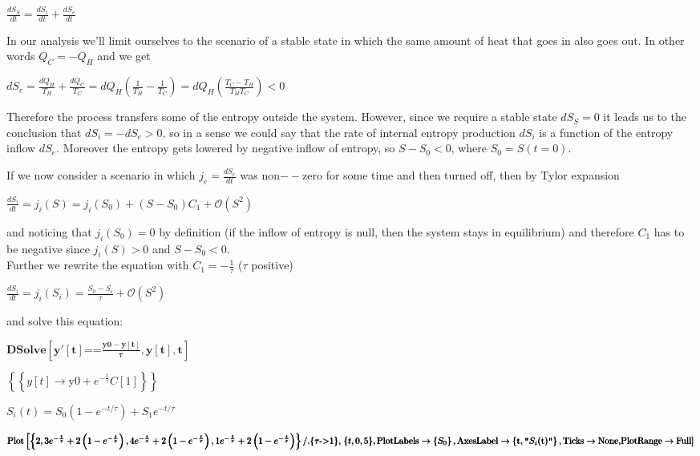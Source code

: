 \documentclass{article}
\begin{document}
\(\frac{dS_S}{dt}=\frac{dS_i}{dt}+\frac{dS_e}{dt}\)

In our analysis we{'}ll limit ourselves to the scenario of a stable state in which the same amount of heat that goes in also goes out. In other words
\(Q_C=-Q_H\) and we get

\(dS_e=\frac{dQ_H}{T_H}+\frac{dQ_C}{T_C}=dQ_H\left(\frac{1}{T_H}-\frac{1}{T_C}\right)=dQ_H\left(\frac{T_C-T_H}{T_HT_C}\right)<0\)

Therefore the process transfers some of the entropy outside the system. However, since we require a stable state \(dS_S=0\) it leads us to the conclusion
that \(dS_i=-dS_e>0\), so in a sense we could say that the rate of internal entropy production \(dS_i\) is a function of the entropy inflow \(dS_e\).
Moreover the entropy gets lowered by negative inflow of entropy, so \(S-S_0<0\), where \(S_0=S(t=0)\).

If we now consider a scenario in which \(j_e=\frac{dS_e}{dt}\) was non$--$zero for some time and then turned off, then by Tylor expansion

\(\frac{dS_i}{dt}=j_i(S)=j_i\left(S_0\right)+\left(S-S_0\right)C_1+\mathcal{O}\left(S^2\right)\)

and noticing that \(j_i\left(S_0\right)=0\) by definition (if the inflow of entropy is null, then the system stays in equilibrium) and therefore
\(C_1\) has to be negative since \(j_i(S)>0\) and \(S-S_0<0\).\\
Further we rewrite the equation with \(C_1=-\frac{1}{\tau }\) (\(\tau\) positive)

\(\frac{dS_i}{dt}=j_i\left(S_i\right)=\frac{S_0-S_i}{\tau }+\mathcal{O}\left(S^2\right)\)

and solve this equation:

\begin{doublespace}
\noindent\(\pmb{\text{DSolve}\left[y'[t]\text{==}\frac{\text{y0}-y[t]}{\tau },y[t],t\right]}\)
\end{doublespace}

\begin{doublespace}
\noindent\(\left\{\left\{y[t]\to \text{y0}+e^{-\frac{t}{\tau }} C[1]\right\}\right\}\)
\end{doublespace}

\(S_i(t)=S_0\left(1-e^{-t/\tau }\right)+S_1e^{-t/\tau }\)

\begin{doublespace}
\noindent\(\pmb{\text{Plot}\left[\left\{2,3e^{-\frac{t}{\tau }} +2\left(1-e^{-\frac{t}{\tau }}\right),4e^{-\frac{t}{\tau }} +2\left(1-e^{-\frac{t}{\tau
}}\right),1e^{-\frac{t}{\tau }} +2\left(1-e^{-\frac{t}{\tau }}\right) \right\}\text{/.}\{\tau \text{-$>$}1\},\right.}\\
\pmb{\{t,0,5\},\text{PlotLabels}\to \left\{S_0\right\},\text{AxesLabel}\to \left\{\text{t},\texttt{"}S_i\text{(t)$\texttt{"}$}\right\},\text{Ticks}\to
\text{None},}\\
\pmb{\text{PlotRange}\to \text{Full}]}\)
\end{doublespace}
\end{document}
